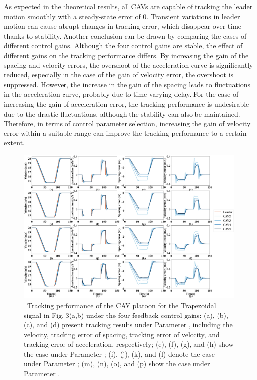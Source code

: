 \documentclass[a4paper]{cas-sc}
\begin{document}
As expected in the theoretical results, all CAVs are capable of tracking the leader motion smoothly with a steady-state error of 0. Transient variations in leader motion can cause abrupt changes in tracking error, which disappear over time thanks to stability. Another conclusion can be drawn by comparing the cases of different control gains. Although the four control gains are stable, the effect of different gains on the tracking performance differs. By increasing the gain of the spacing and velocity errors, the overshoot of the acceleration curve is significantly reduced, especially in the case of the gain of velocity error, the overshoot is suppressed. However, the increase in the gain of the spacing leads to fluctuations in the acceleration curve, probably due to time-varying delay. For the case of increasing the gain of acceleration error, the tracking performance is undesirable due to the drastic fluctuations, although the stability can also be maintained. Therefore, in terms of control parameter selection, increasing the gain of velocity error within a suitable range can improve the tracking performance to a certain extent.


\begin{figure}

  \centering
  \includegraphics[width=14cm]{figs/fig4.png}
  \caption{~Tracking performance of the CAV platoon for the Trapezoidal signal in Fig. 3(a,b) under the four feedback control gains: (a), (b), (c), and (d) present tracking results under Parameter \uppercase\expandafter{}, including the velocity, tracking error of spacing, tracking error of velocity, and tracking error of acceleration, respectively; (e), (f), (g), and (h) show the case under Parameter \uppercase\expandafter{}; (i), (j), (k), and (l) denote the case under Parameter \uppercase\expandafter{}; (m), (n), (o), and (p) show the case under Parameter \uppercase\expandafter{}.}
  \label{fig4}
\end{figure}
\end{document}
